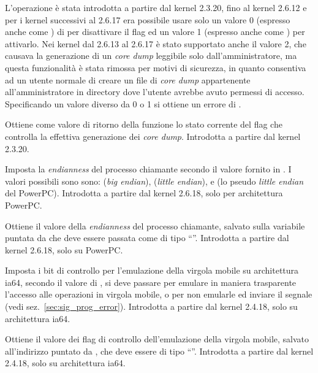 \begin{basedescript}{\desclabelwidth{1.5cm}\desclabelstyle{\nextlinelabel}}
  L'operazione è stata introdotta a partire dal kernel 2.3.20, fino al kernel
  2.6.12 e per i kernel successivi al 2.6.17 era possibile usare solo un
  valore 0 (espresso anche come ) di 
  per disattivare il flag ed un valore 1 (espresso anche come
  ) per attivarlo. Nei kernel dal 2.6.13 al 2.6.17 è
  stato supportato anche il valore 2, che causava la generazione di un
  \textit{core dump} leggibile solo dall'amministratore, ma questa
  funzionalità è stata rimossa per motivi di sicurezza, in quanto consentiva
  ad un utente normale di creare un file di \textit{core dump} appartenente
  all'amministratore in directory dove l'utente avrebbe avuto permessi di
  accesso. Specificando un valore diverso da 0 o 1 si ottiene un errore di
  .

\item[\constd{PR\_GET\_DUMPABLE}] Ottiene come valore di ritorno della funzione
  lo stato corrente del flag che controlla la effettiva generazione dei
  \textit{core dump}. Introdotta a partire dal kernel 2.3.20.

\item[\constd{PR\_SET\_ENDIAN}] Imposta la \textit{endianness} del processo
  chiamante secondo il valore fornito in . I valori possibili sono
  sono:  (\textit{big endian}),
   (\textit{little endian}), e
   (lo pseudo \textit{little endian} del
  PowerPC). Introdotta a partire dal kernel 2.6.18, solo per architettura
  PowerPC.

\item[\constd{PR\_GET\_ENDIAN}] Ottiene il valore della \textit{endianness} del
  processo chiamante, salvato sulla variabile puntata da  che deve
  essere passata come di tipo ``''. Introdotta a partire dal
  kernel 2.6.18, solo su PowerPC.

\item[\constd{PR\_SET\_FPEMU}] Imposta i bit di controllo per l'emulazione
  della virgola mobile su architettura ia64, secondo il valore
  di , si deve passare  per emulare in
  maniera trasparente l'accesso alle operazioni in virgola mobile, o
   per non emularle ed inviare il segnale
   (vedi sez.~\ref{sec:sig_prog_error}). Introdotta a partire
  dal kernel 2.4.18, solo su architettura ia64.

\item[\constd{PR\_GET\_FPEMU}] Ottiene il valore dei flag di controllo
  dell'emulazione della virgola mobile, salvato all'indirizzo puntato
  da , che deve essere di tipo ``''. Introdotta a
  partire dal kernel 2.4.18, solo su architettura ia64.


\end{basedescript}
